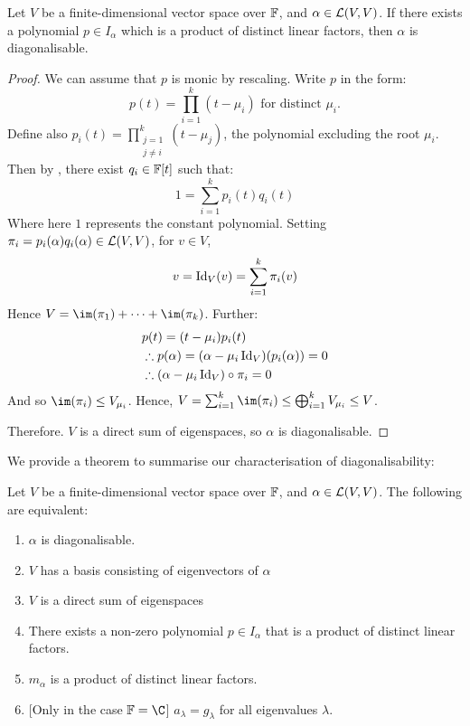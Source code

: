 \documentclass[../Main.tex]{subfiles}
\begin{document}
\begin{theorem}
    Let $V$ be a finite-dimensional vector space over $\mathbb{F}$, and $\alpha \in \mathcal{L}(V, V)$. If there exists a polynomial $p \in I_\alpha$ which is a product of distinct linear factors, then $\alpha$ is diagonalisable.
    \label{thmProdDistinctFactorsDiag}
\end{theorem}
\begin{proof}
    We can assume that $p$ is monic by rescaling. Write $p$ in the form:
    \begin{equation*}
        p(t) = \prod_{i=1}^{k} (t - \mu_i) \text{ for distinct $\mu_i$.}
    \end{equation*}
    Define also $p_i(t) = \prod_{\substack{j = 1\\j \neq i}}^{k} (t - \mu_j)$, the polynomial excluding the root $\mu_i$. Then by , there exist $q_i \in \mathbb{F}[t]$ such that:
    \begin{equation*}
        1 = \sum_{i=1}^{k} p_i(t) q_i(t)
    \end{equation*}
    Where here $1$ represents the constant polynomial. Setting $\pi_i = p_i(\alpha) q_i(\alpha) \in \mathcal{L}(V, V)$, for $v \in V$,
    \begin{equation*}
        v = \operatorname{Id}_V(v) = \sum_{i=1}^{k} \pi_i(v)
    \end{equation*}
    Hence $V = \im(\pi_1) + \cdots + \im(\pi_k)$. Further:
    \begin{align*}
        &p(t) = (t - \mu_i)p_i(t) \\
        &\therefore p(\alpha) = (\alpha - \mu_i \operatorname{Id}_V)(p_i(\alpha)) = 0 \\
        &\therefore (\alpha - \mu_i\operatorname{Id}_V) \circ \pi_i = 0
    \end{align*}
    And so $\im(\pi_i) \leq V_{\mu_i}$. Hence, $V = \sum_{i=1}^{k} \im(\pi_i) \leq \bigoplus_{i=1}^k V_{\mu_i} \leq V$.

    Therefore. $V$ is a direct sum of eigenspaces, so $\alpha$ is diagonalisable.
\end{proof}
We provide a theorem to summarise our characterisation of diagonalisability:
\begin{theorem}
    Let $V$ be a finite-dimensional vector space over $\mathbb{F}$, and $\alpha \in \mathcal{L}(V, V)$. The following are equivalent:
    \begin{enumerate}
        \item $\alpha$ is diagonalisable.
        \item $V$ has a basis consisting of eigenvectors of $\alpha$
        \item $V$ is a direct sum of eigenspaces
        \item There exists a non-zero polynomial $p \in I_\alpha$ that is a product of distinct linear factors.
        \item $m_\alpha$ is a product of distinct linear factors.
        \item {[Only in the case $\F = \C$]} $a_\lambda = g_\lambda$ for all eigenvalues $\lambda$.
    \end{enumerate}
    \label{thmDiagConditions}
\end{theorem}
\end{document}
